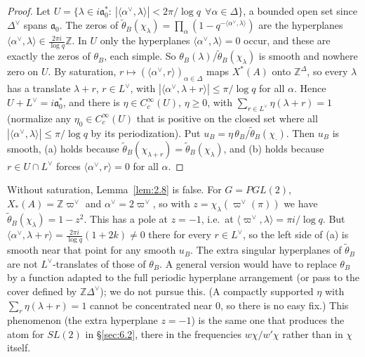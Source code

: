 \documentclass[12pt,letterpaper]{article}
\numberwithin{equation}{section}
\theoremstyle{plain}
\theoremstyle{remark}
\theoremstyle{plain}
\theoremstyle{definition}
\theoremstyle{remark}
\theoremstyle{remark}
\newcommand{\fa}{\mathfrak{a}}
\newcommand{\ip}[1]{\langle #1\rangle}
\begin{document}
\begin{proof}
Let $U=\{\lambda\in i\fa_0^*:\ |\ip{\alpha^\vee,\lambda}|<2\pi/\log q\ \ \forall\alpha\in\Delta\}$, a bounded open set since $\Delta^\vee$ spans $\fa_0$. The zeros of $\tilde\theta_B(\chi_\lambda)=\prod_\alpha(1-q^{-\ip{\alpha^\vee,\lambda}})$ are the hyperplanes $\ip{\alpha^\vee,\lambda}\in\frac{2\pi i}{\log q}\mathbb{Z}$. In $U$ only the hyperplanes $\ip{\alpha^\vee,\lambda}=0$ occur, and these are exactly the zeros of $\theta_B$, each simple. So $\theta_B(\lambda)/\tilde\theta_B(\chi_\lambda)$ is smooth and nowhere zero on $U$. By saturation, $r\mapsto(\ip{\alpha^\vee,r})_{\alpha\in\Delta}$ maps $X^*(A)$ onto $\mathbb{Z}^\Delta$, so every $\lambda$ has a translate $\lambda+r$, $r\in L^\vee$, with $|\ip{\alpha^\vee,\lambda+r}|\le\pi/\log q$ for all $\alpha$. Hence $U+L^\vee=i\fa_0^*$, and there is $\eta\in C_c^\infty(U)$, $\eta\ge0$, with $\sum_{r\in L^\vee}\eta(\lambda+r)=1$ (normalize any $\eta_0\in C^\infty_c(U)$ that is positive on the closed set where all $|\ip{\alpha^\vee,\lambda}|\le\pi/\log q$ by its periodization). Put $u_B=\eta\,\theta_B/\tilde\theta_B(\chi_\cdot)$. Then $u_B$ is smooth, (a) holds because $\tilde\theta_B(\chi_{\lambda+r})=\tilde\theta_B(\chi_\lambda)$, and (b) holds because $r\in U\cap L^\vee$ forces $\ip{\alpha^\vee,r}=0$ for all $\alpha$.
\end{proof}

\begin{rem26}\label{r:L28}
Without saturation, Lemma~\ref{lem:2.8} is false. For $G=PGL(2)$, $X_*(A)=\mathbb{Z}\varpi^\vee$ and $\alpha^\vee=2\varpi^\vee$, so with $z=\chi_\lambda(\varpi^\vee(\pi))$ we have $\tilde\theta_B(\chi_\lambda)=1-z^2$. This has a pole at $z=-1$, i.e.\ at $\ip{\varpi^\vee,\lambda}=\pi i/\log q$. But $\ip{\alpha^\vee,\lambda+r}=\frac{2\pi i}{\log q}(1+2k)\ne0$ there for every $r\in L^\vee$, so the left side of (a) is smooth near that point for any smooth $u_B$. The extra singular hyperplanes of $\tilde\theta_B$ are not $L^\vee$-translates of those of $\theta_B$. A general version would have to replace $\theta_B$ by a function adapted to the full periodic hyperplane arrangement (or pass to the cover defined by $\mathbb{Z}\Delta^\vee$); we do not pursue this. (A compactly supported $\eta$ with $\sum_r\eta(\lambda+r)=1$ cannot be concentrated near $0$, so there is no easy fix.) This phenomenon (the extra hyperplane $z=-1$) is the same one that produces the atom for $SL(2)$ in \S\ref{sec:6.2}, there in the frequencies $w\chi/w'\chi$ rather than in $\chi$ itself.
\end{rem26}
\end{document}

